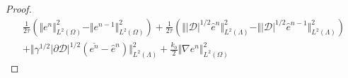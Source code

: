 \documentclass[pdflatex,sn-mathphys-num]{sn-jnl}%
\newcommand{\bfU}{{\boldsymbol U}}
\theoremstyle{thmstyleone}%
\theoremstyle{thmstyletwo}%
\theoremstyle{thmstylethree}%
\begin{document}
\begin{proof}
\begin{align*}
    \frac{1}{2\tau} \left(
\Vert   e^n \Vert_{L^2(\Omega)}^2
-\Vert  e^{n-1} \Vert_{L^2(\Omega)}^2 \right)
    + \frac{1}{2\tau} \left(
\Vert \vert \mathcal{D}\vert^{1/2} \hat e^n \Vert_{L^2(\Lambda)}^2
-\Vert \vert \mathcal{D}\vert^{1/2} \hat e^{n-1} \Vert_{L^2(\Lambda)}^2\right)
\nonumber\\
+ \Vert \gamma^{1/2} \vert \partial\mathcal{D}\vert^{1/2} (\overline{e^{n}}-\hat{e}^{n}) \Vert_{L^2(\Lambda)}^2
+\frac{k_0}{2}  \Vert \nabla e^n \Vert_{L^2(\Omega)}^2

\end{align*}
\end{proof}
\end{document}
